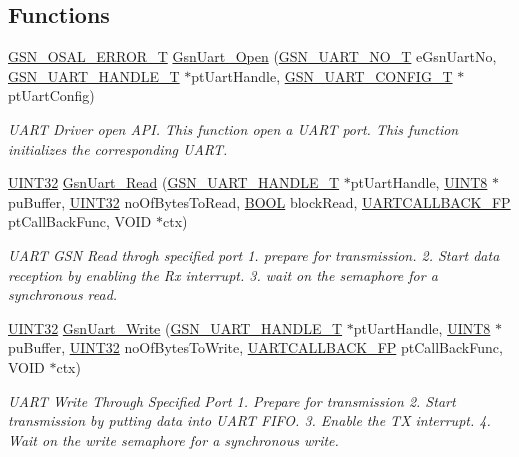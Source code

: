 \subsection*{Functions}
\begin{DoxyCompactItemize}
\item 
\hyperlink{a00659_ga36216a7aacd1d5024bc7b8bf39c3f46b}{GSN\_\-OSAL\_\-ERROR\_\-T} \hyperlink{a00656_ga65b923fe4ca7d5f30850d9112c2b3c8d}{GsnUart\_\-Open} (\hyperlink{a00656_ga2e91880e4d139a83add2ffc3a75ad653}{GSN\_\-UART\_\-NO\_\-T} eGsnUartNo, \hyperlink{a00266}{GSN\_\-UART\_\-HANDLE\_\-T} $\ast$ptUartHandle, \hyperlink{a00268}{GSN\_\-UART\_\-CONFIG\_\-T} $\ast$ptUartConfig)
\begin{DoxyCompactList}\small\item\em UART Driver open API. This function open a UART port. This function initializes the corresponding UART. \end{DoxyCompactList}\item 
\hyperlink{a00660_gae1e6edbbc26d6fbc71a90190d0266018}{UINT32} \hyperlink{a00656_ga6b0eacf5eb9ff518c5cf462f417504ea}{GsnUart\_\-Read} (\hyperlink{a00266}{GSN\_\-UART\_\-HANDLE\_\-T} $\ast$ptUartHandle, \hyperlink{a00660_gab27e9918b538ce9d8ca692479b375b6a}{UINT8} $\ast$puBuffer, \hyperlink{a00660_gae1e6edbbc26d6fbc71a90190d0266018}{UINT32} noOfBytesToRead, \hyperlink{a00660_ga1f04022c0a182c51c059438790ea138c}{BOOL} blockRead, \hyperlink{a00600_a2e597592e12f52e6b9f19cffdcd2378f}{UARTCALLBACK\_\-FP} ptCallBackFunc, VOID $\ast$ctx)
\begin{DoxyCompactList}\small\item\em UART GSN Read throgh specified port 1. prepare for transmission. 2. Start data reception by enabling the Rx interrupt. 3. wait on the semaphore for a synchronous read. \end{DoxyCompactList}\item 
\hyperlink{a00660_gae1e6edbbc26d6fbc71a90190d0266018}{UINT32} \hyperlink{a00656_gae5731c2af6519762d209aa7b5764356d}{GsnUart\_\-Write} (\hyperlink{a00266}{GSN\_\-UART\_\-HANDLE\_\-T} $\ast$ptUartHandle, \hyperlink{a00660_gab27e9918b538ce9d8ca692479b375b6a}{UINT8} $\ast$puBuffer, \hyperlink{a00660_gae1e6edbbc26d6fbc71a90190d0266018}{UINT32} noOfBytesToWrite, \hyperlink{a00600_a2e597592e12f52e6b9f19cffdcd2378f}{UARTCALLBACK\_\-FP} ptCallBackFunc, VOID $\ast$ctx)
\begin{DoxyCompactList}\small\item\em UART Write Through Specified Port 1. Prepare for transmission 2. Start transmission by putting data into UART FIFO. 3. Enable the TX interrupt. 4. Wait on the write semaphore for a synchronous write. \end{DoxyCompactList}\item 

\end{DoxyCompactItemize}
